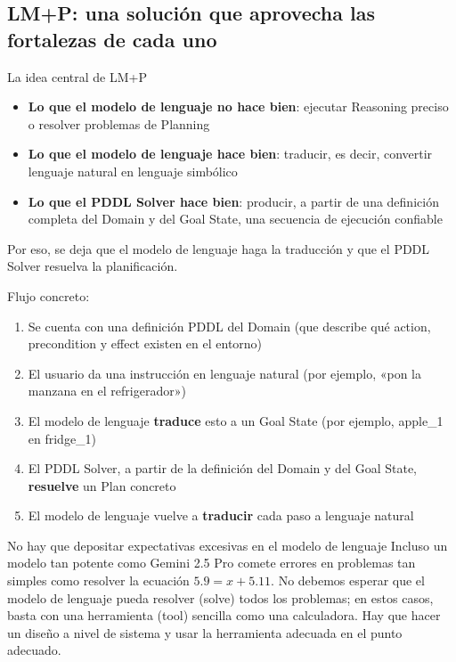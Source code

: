\documentclass[a4paper]{article}
\begin{document}
\subsection{LM+P: una solución que aprovecha las fortalezas de cada uno}

\begin{importantbox}{La idea central de LM+P}
\begin{itemize}
    \item \textbf{Lo que el modelo de lenguaje no hace bien}: ejecutar Reasoning preciso o resolver problemas de Planning
    \item \textbf{Lo que el modelo de lenguaje hace bien}: traducir, es decir, convertir lenguaje natural en lenguaje simbólico
    \item \textbf{Lo que el PDDL Solver hace bien}: producir, a partir de una definición completa del Domain y del Goal State, una secuencia de ejecución confiable
\end{itemize}
Por eso, se deja que el modelo de lenguaje haga la traducción y que el PDDL Solver resuelva la planificación.
\end{importantbox}

Flujo concreto:
\begin{enumerate}
    \item Se cuenta con una definición PDDL del Domain (que describe qué action, precondition y effect existen en el entorno)
    \item El usuario da una instrucción en lenguaje natural (por ejemplo, «pon la manzana en el refrigerador»)
    \item El modelo de lenguaje \textbf{traduce} esto a un Goal State (por ejemplo, apple\_1 en fridge\_1)
    \item El PDDL Solver, a partir de la definición del Domain y del Goal State, \textbf{resuelve} un Plan concreto
    \item El modelo de lenguaje vuelve a \textbf{traducir} cada paso a lenguaje natural
\end{enumerate}

\begin{warningbox}{No hay que depositar expectativas excesivas en el modelo de lenguaje}
Incluso un modelo tan potente como Gemini 2.5 Pro comete errores en problemas tan simples como resolver la ecuación $5.9 = x + 5.11$. No debemos esperar que el modelo de lenguaje pueda resolver (solve) todos los problemas; en estos casos, basta con una herramienta (tool) sencilla como una calculadora. Hay que hacer un diseño a nivel de sistema y usar la herramienta adecuada en el punto adecuado.
\end{warningbox}
\end{document}
